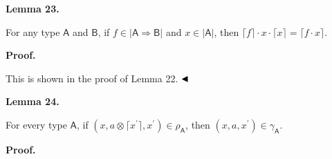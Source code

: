 \documentclass[10pt,a4paper]{amsart}
\begin{document}
 
 
\par\medskip\noindent\textbf{Lemma 23.}\par
 
 
For any type $\mathsf{A}$ and $\mathsf{B}$, if $f\in|\mathsf{A}\Rightarrow\mathsf{B}|$ and $x\in|\mathsf{A}|$, then $\lceil f\rceil\cdot x\cdot\lceil x\rceil=\lceil f\cdot x\rceil$.\par
 
 
 
 
 
\par\medskip\noindent\textbf{Proof.}\par
 
 
This is shown in the proof of Lemma 22. $\hfill\blacktriangleleft$\par
 
 
 
\par\medskip\noindent\textbf{Lemma 24.}\par
 
 
For every type $\mathsf{A}$, if $(x,a\otimes\lceil x^{\prime}\rceil,x^{\prime})\in\rho_{\mathsf{A}}$, then $(x,a,x^{\prime})\in\gamma_{\mathsf{A}}$.\par
 
 
 
 
 
\par\medskip\noindent\textbf{Proof.}\par
 
 
\end{document}
